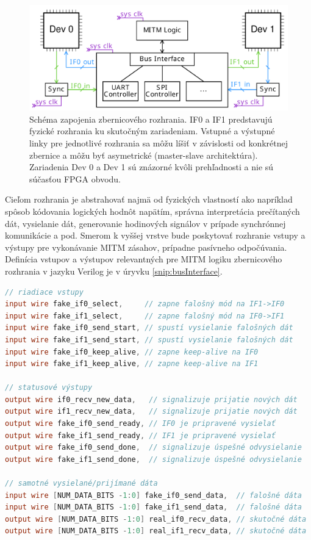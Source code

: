 \begin{figure}
    \centerline{\includegraphics[width=1\textwidth]{images/designs/busInterface.pdf}}
    \caption[Schéma zapojenia zbernicového rozhrania]{Schéma zapojenia zbernicového rozhrania. IF0 a IF1 predstavujú fyzické rozhrania ku skutočným zariadeniam. Vstupné a výstupné linky pre jednotlivé rozhrania sa môžu líšiť v závislosti od konkrétnej zbernice a môžu byť asymetrické (master-slave architektúra). Zariadenia Dev 0 a Dev 1 sú znázorné kvôli prehľadnosti a nie sú súčasťou FPGA obvodu.}
    \label{obr:busInterface}
\end{figure}

Cieľom rozhrania je abstrahovať najmä od fyzických vlastností ako napríklad spôsob kódovania logických hodnôt napätím, správna interpretácia prečítaných dát, vysielanie dát, generovanie hodinových signálov v prípade synchrónnej komunikácie a pod. Smerom k vyššej vrstve bude poskytovať rozhranie vstupy a výstupy pre vykonávanie MITM zásahov, prípadne pasívneho odpočúvania. Definícia vstupov a výstupov relevantných pre MITM logiku zbernicového rozhrania v jazyku Verilog je v úryvku \ref{snip:busInterface}.

\begin{lstlisting}[float,language=Verilog,caption={Definícia vstupov a výstupov zbernicového rozhrania pre MITM logiku.},label=snip:busInterface]
// riadiace vstupy
input wire fake_if0_select,     // zapne falošný mód na IF1->IF0
input wire fake_if1_select,     // zapne falošný mód na IF0->IF1
input wire fake_if0_send_start, // spustí vysielanie falošných dát
input wire fake_if1_send_start, // spustí vysielanie falošných dát
input wire fake_if0_keep_alive, // zapne keep-alive na IF0
input wire fake_if1_keep_alive, // zapne keep-alive na IF1

// statusové výstupy
output wire if0_recv_new_data,   // signalizuje prijatie nových dát
output wire if1_recv_new_data,   // signalizuje prijatie nových dát
output wire fake_if0_send_ready, // IF0 je pripravené vysielať   
output wire fake_if1_send_ready, // IF1 je pripravené vysielať   
output wire fake_if0_send_done,  // signalizuje úspešné odvysielanie
output wire fake_if1_send_done,  // signalizuje úspešné odvysielanie

// samotné vysielané/prijímané dáta
input wire [NUM_DATA_BITS -1:0] fake_if0_send_data,  // falošné dáta
input wire [NUM_DATA_BITS -1:0] fake_if1_send_data,  // falošné dáta
output wire [NUM_DATA_BITS -1:0] real_if0_recv_data, // skutočné dáta
output wire [NUM_DATA_BITS -1:0] real_if1_recv_data, // skutočné dáta
\end{lstlisting}

